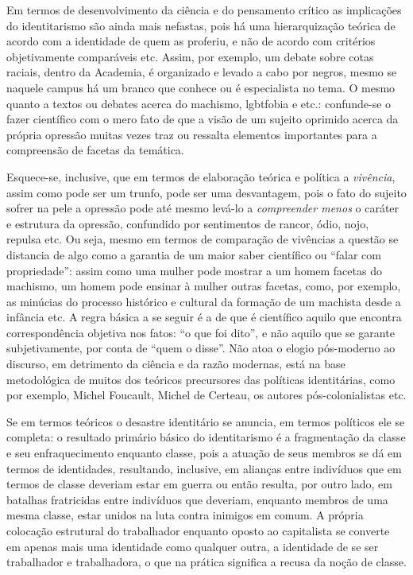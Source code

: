 Em termos de desenvolvimento da ciência e do pensamento crítico as
implicações do identitarismo são ainda mais nefastas, pois há uma
hierarquização teórica de acordo com a identidade de quem as proferiu, e
não de acordo com critérios objetivamente comparáveis etc. Assim, por
exemplo, um debate sobre cotas raciais, dentro da Academia, é organizado
e levado a cabo por negros, mesmo se naquele campus há um branco que
conhece ou é especialista no tema. O mesmo quanto a textos ou debates
acerca do machismo, lgbtfobia e etc.: confunde-se o fazer científico com
o mero fato de que a visão de um sujeito oprimido acerca da própria
opressão muitas vezes traz ou ressalta elementos importantes para a
compreensão de facetas da temática.

Esquece-se, inclusive, que em termos de elaboração teórica e política a
\emph{vivência}, assim como pode ser um trunfo, pode ser uma
desvantagem, pois o fato do sujeito sofrer na pele a opressão pode até
mesmo levá-lo a \emph{compreender menos} o caráter e estrutura da
opressão, confundido por sentimentos de rancor, ódio, nojo, repulsa etc.
Ou seja, mesmo em termos de comparação de vivências a questão se
distancia de algo como a garantia de um maior saber científico ou
``falar com propriedade'': assim como uma mulher pode mostrar a um homem
facetas do machismo, um homem pode ensinar à mulher outras facetas,
como, por exemplo, as minúcias do processo histórico e cultural da
formação de um machista desde a infância etc. A regra básica a se seguir
é a de que é científico aquilo que encontra correspondência objetiva nos
fatos: ``o que foi dito'', e não aquilo que se garante subjetivamente,
por conta de ``quem o disse''. Não atoa o elogio pós-moderno ao
discurso, em detrimento da ciência e da razão modernas, está na base
metodológica de muitos dos teóricos precursores das políticas
identitárias, como por exemplo, Michel Foucault, Michel de Certeau, os
autores pós-colonialistas etc.

Se em termos teóricos o desastre identitário se anuncia, em termos
políticos ele se completa: o resultado primário básico do identitarismo
é a fragmentação da classe e seu enfraquecimento enquanto classe, pois a
atuação de seus membros se dá em termos de identidades, resultando,
inclusive, em alianças entre indivíduos que em termos de classe deveriam
estar em guerra ou então resulta, por outro lado, em batalhas
fratricidas entre indivíduos que deveriam, enquanto membros de uma mesma
classe, estar unidos na luta contra inimigos em comum. A própria
colocação estrutural do trabalhador enquanto oposto ao capitalista se
converte em apenas mais uma identidade como qualquer outra, a identidade
de se ser trabalhador e trabalhadora, o que na prática significa a
recusa da noção de classe.

